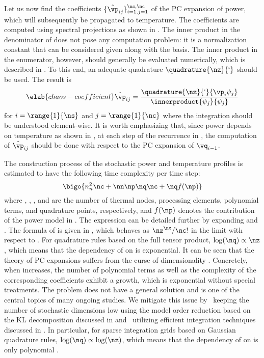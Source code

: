 Let us now find the coefficients $\{ \hat{\vp}_{ij} \}_{i = 1, j = 1}^{\ns,
\nc}$ of the \ac{PC} expansion of power, which will subsequently be propagated
to temperature. The coefficients are computed using spectral projections as
shown in . The inner product in the denominator of
 does not pose any computation problem: it is a
normalization constant that can be considered given along with the basis. The
inner product in the enumerator, however, should generally be evaluated
numerically, which is described in . To this end, an
adequate quadrature $\quadrature{\nz}{\lq}$ should be used. The result is
\begin{equation} \elab{chaos-coefficient}
  \hat{\vp}_{ij} = \frac{\quadrature{\nz}{\lq}{\vp_i \psi_j}}{\innerproduct{\psi_j}{\psi_j}}
\end{equation}
for $i = \range{1}{\ns}$ and $j = \range{1}{\nc}$ where the integration should
be understood element-wise. It is worth emphasizing that, since power depends on
temperature as shown in , at each step of the recurrence in
, the computation of $\hat{\vp}_{ij}$ should be done with
respect to the \ac{PC} expansion of $\vq_{i - 1}$.

The construction process of the stochastic power and temperature profiles is
estimated to have the following time complexity per time step:
\[
  \bigo{n_n^2 \nc + \nn \np \nq \nc + \nq f(\np)}
\]
where \nn, \np, \nc, and \nq are the number of thermal nodes, processing
elements, polynomial terms, and quadrature points, respectively, and $f(\np)$
denotes the contribution of the power model in . The
expression can be detailed further by expanding \nc and \nq. The formula of \nc
is given in , which behaves as $\nz^\nc / \nc!$
in the limit with respect to \nz. For quadrature rules based on the full tensor
product, $\log(\nq) \propto \nz$, which means that the dependency of \nq on \nz
is exponential. It can be seen that the theory of \ac{PC} expansions suffers
from the curse of dimensionality \cite{eldred2008, xiu2010}. Concretely, when
\nz increases, the number of polynomial terms as well as the complexity of the
corresponding coefficients exhibit a growth, which is exponential without
special treatments. The problem does not have a general solution and is one of
the central topics of many ongoing studies. We mitigate this issue by
\one~keeping the number of stochastic dimensions low using the model order
reduction based on the \ac{KL} decomposition discussed in
 and \two~utilizing efficient integration
techniques discussed in . In particular, for sparse
integration grids based on Gaussian quadrature rules, $\log(\nq) \propto
\log(\nz)$, which means that the dependency of \nq on \nz is only polynomial
\cite{heiss2008}.

